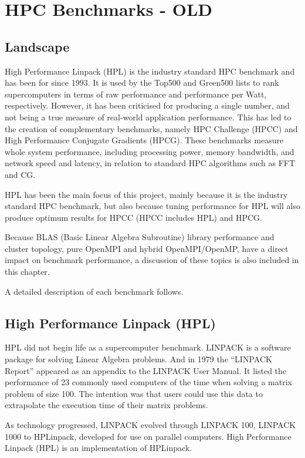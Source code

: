 \documentclass{report}
\begin{document}
%
%
\chapter{HPC Benchmarks - OLD}


%
%
\section{Landscape}

High Performance Linpack (HPL) is the industry standard HPC benchmark and has been for since 1993. It is used by the Top500 and Green500 lists to rank supercomputers in terms of raw performance and performance per Watt, respectively. However, it has been criticised for producing a single number, and not being a true measure of real-world application performance. This has led to the creation of complementary benchmarks, namely HPC Challenge (HPCC) and High Performance Conjugate Gradients (HPCG). These benchmarks measure whole system performance, including processing power, memory bandwidth, and network speed and latency, in relation to standard HPC algorithms such as FFT and CG.

HPL has been the main focus of this project, mainly because it is the industry standard HPC benchmark, but also because tuning performance for HPL will also produce optimum results for HPCC (HPCC includes HPL) and HPCG.

Because BLAS (Basic Linear Algebra Subroutine) library performance and cluster topology, pure OpenMPI and hybrid OpenMPI/OpenMP, have a direct impact on benchmark performance, a discussion of these topics is also included in this chapter. 


A detailed description of each benchmark follows.

%
%
\section{High Performance Linpack (HPL)}

HPL did not begin life as a supercomputer benchmark. LINPACK is a software package for solving Linear Algebra problems. And in 1979 the ``LINPACK Report'' appeared as an appendix to the LINPACK User Manual. It listed the performance of 23 commonly used computers of the time when solving a matrix problem of size 100. The intention was that users could use this data to extrapolate the execution time of their matrix problems.

As technology progressed, LINPACK evolved through LINPACK 100, LINPACK 1000 to HPLinpack, developed for use on parallel computers. High Performance Linpack (HPL) is an implementation of HPLinpack.
\end{document}
